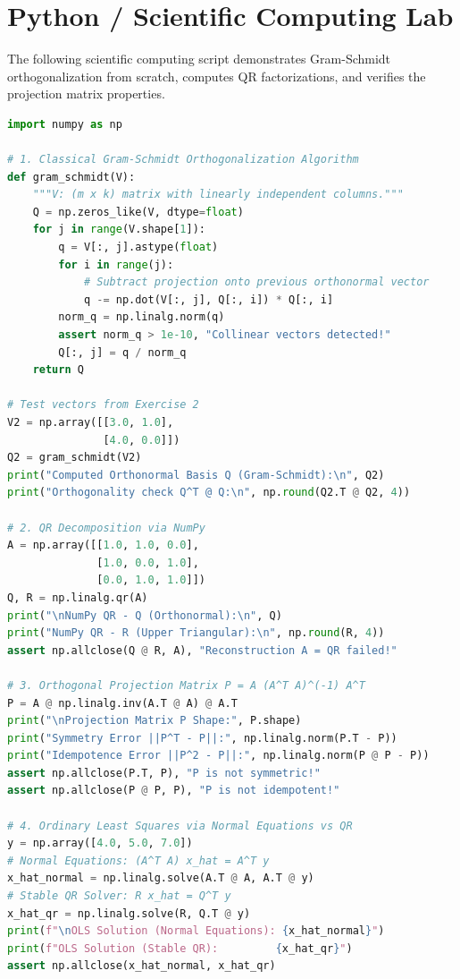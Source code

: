 \section{Python / Scientific Computing Lab}

The following scientific computing script demonstrates Gram-Schmidt orthogonalization from scratch, computes QR factorizations, and verifies the projection matrix properties.

\begin{lstlisting}[language=Python, caption={Python Lab: Gram-Schmidt, QR Decomposition, and Orthogonal Projections}]
import numpy as np

# 1. Classical Gram-Schmidt Orthogonalization Algorithm
def gram_schmidt(V):
    """V: (m x k) matrix with linearly independent columns."""
    Q = np.zeros_like(V, dtype=float)
    for j in range(V.shape[1]):
        q = V[:, j].astype(float)
        for i in range(j):
            # Subtract projection onto previous orthonormal vector
            q -= np.dot(V[:, j], Q[:, i]) * Q[:, i]
        norm_q = np.linalg.norm(q)
        assert norm_q > 1e-10, "Collinear vectors detected!"
        Q[:, j] = q / norm_q
    return Q

# Test vectors from Exercise 2
V2 = np.array([[3.0, 1.0],
               [4.0, 0.0]])
Q2 = gram_schmidt(V2)
print("Computed Orthonormal Basis Q (Gram-Schmidt):\n", Q2)
print("Orthogonality check Q^T @ Q:\n", np.round(Q2.T @ Q2, 4))

# 2. QR Decomposition via NumPy
A = np.array([[1.0, 1.0, 0.0],
              [1.0, 0.0, 1.0],
              [0.0, 1.0, 1.0]])
Q, R = np.linalg.qr(A)
print("\nNumPy QR - Q (Orthonormal):\n", Q)
print("NumPy QR - R (Upper Triangular):\n", np.round(R, 4))
assert np.allclose(Q @ R, A), "Reconstruction A = QR failed!"

# 3. Orthogonal Projection Matrix P = A (A^T A)^(-1) A^T
P = A @ np.linalg.inv(A.T @ A) @ A.T
print("\nProjection Matrix P Shape:", P.shape)
print("Symmetry Error ||P^T - P||:", np.linalg.norm(P.T - P))
print("Idempotence Error ||P^2 - P||:", np.linalg.norm(P @ P - P))
assert np.allclose(P.T, P), "P is not symmetric!"
assert np.allclose(P @ P, P), "P is not idempotent!"

# 4. Ordinary Least Squares via Normal Equations vs QR
y = np.array([4.0, 5.0, 7.0])
# Normal Equations: (A^T A) x_hat = A^T y
x_hat_normal = np.linalg.solve(A.T @ A, A.T @ y)
# Stable QR Solver: R x_hat = Q^T y
x_hat_qr = np.linalg.solve(R, Q.T @ y)
print(f"\nOLS Solution (Normal Equations): {x_hat_normal}")
print(f"OLS Solution (Stable QR):         {x_hat_qr}")
assert np.allclose(x_hat_normal, x_hat_qr)
\end{lstlisting}

